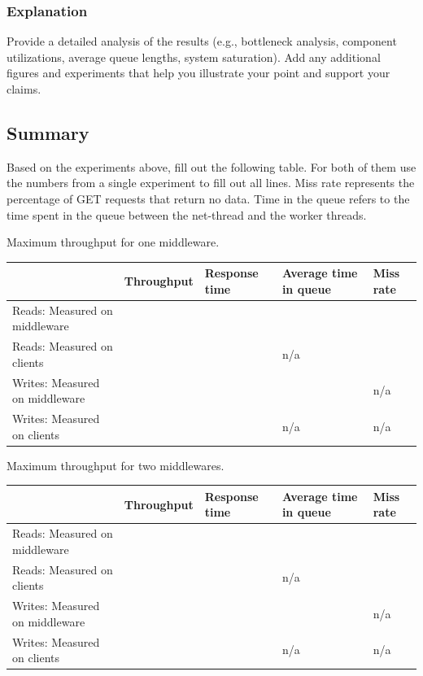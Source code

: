 \documentclass[11pt,a4paper]{article}
\begin{document}
\subsubsection{Explanation}

Provide a detailed analysis of the results (e.g., bottleneck analysis, component utilizations, average queue lengths, system saturation). Add any additional figures and experiments that help you illustrate your point and support your claims.

\subsection{Summary}

Based on the experiments above, fill out the following table. For both of them use the numbers from a single experiment to fill out all lines. Miss rate represents the percentage of GET requests that return no data. Time in the queue refers to the time spent in the queue between the net-thread and the worker threads.


\begin{center}
	{Maximum throughput for one middleware.}
	\begin{tabular}{|l|p{2cm}|p{2cm}|p{2cm}|p{2cm}|}
		\hline                                & Throughput & Response time & Average time in queue & Miss rate \\
		\hline Reads: Measured on middleware  &            &               &                       &           \\
		\hline Reads: Measured on clients     &            &               & n/a                   &           \\
		\hline Writes: Measured on middleware &            &               &                       & n/a       \\
		\hline Writes: Measured on clients    &            &               & n/a                   & n/a       \\
		\hline
	\end{tabular}
\end{center}

\begin{center}
	{Maximum throughput for two middlewares.}
	\begin{tabular}{|l|p{2cm}|p{2cm}|p{2cm}|p{2cm}|}
		\hline                                & Throughput & Response time & Average time in queue & Miss rate \\
		\hline Reads: Measured on middleware  &            &               &                       &           \\
		\hline Reads: Measured on clients     &            &               & n/a                   &           \\
		\hline Writes: Measured on middleware &            &               &                       & n/a       \\
		\hline Writes: Measured on clients    &            &               & n/a                   & n/a       \\
		\hline
	\end{tabular}
\end{center}
\end{document}
